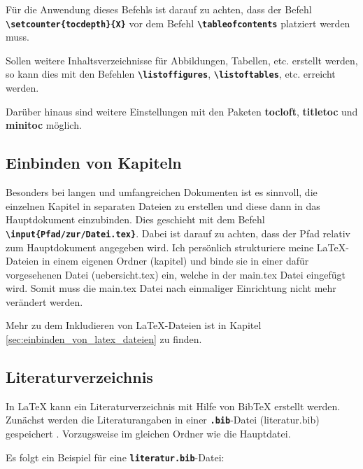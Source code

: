 Für die Anwendung dieses Befehls ist darauf zu achten, dass der Befehl \textbf{\texttt{\textbackslash setcounter\{tocdepth\}\{X\}}} vor dem Befehl \textbf{\texttt{\textbackslash tableofcontents}} platziert werden muss.

Sollen weitere Inhaltsverzeichnisse für Abbildungen, Tabellen, etc. erstellt werden, so kann dies mit den Befehlen \textbf{\texttt{\textbackslash listoffigures}}, \textbf{\texttt{\textbackslash listoftables}}, etc. erreicht werden.


Darüber hinaus sind weitere Einstellungen mit den Paketen \textbf{tocloft}, \textbf{titletoc} und \textbf{minitoc} möglich.

\subsection{Einbinden von Kapiteln}
Besonders bei langen und umfangreichen Dokumenten ist es sinnvoll, die einzelnen Kapitel in separaten Dateien zu erstellen und diese dann in das Hauptdokument einzubinden. Dies geschieht mit dem Befehl \textbf{\texttt{\textbackslash input\{Pfad/zur/Datei.tex\}}}. Dabei ist darauf zu achten, dass der Pfad relativ zum Hauptdokument angegeben wird.
Ich persönlich strukturiere meine \LaTeX{}-Dateien in einem eigenen Ordner (kapitel) und binde sie in einer dafür vorgesehenen Datei (uebersicht.tex) ein, welche in der main.tex Datei eingefügt wird. Somit muss die main.tex Datei nach einmaliger Einrichtung nicht mehr verändert werden.

Mehr zu dem Inkludieren von \LaTeX{}-Dateien ist in Kapitel \ref{sec:einbinden_von_latex_dateien} zu finden.


\subsection{Literaturverzeichnis}
In \LaTeX{} kann ein Literaturverzeichnis mit Hilfe von BibTeX erstellt werden.
Zunächst werden die Literaturangaben in einer \textbf{\texttt{.bib}}-Datei (literatur.bib) gespeichert . Vorzugsweise im gleichen Ordner wie die Hauptdatei.

Es folgt ein Beispiel für eine \textbf{\texttt{literatur.bib}}-Datei:

